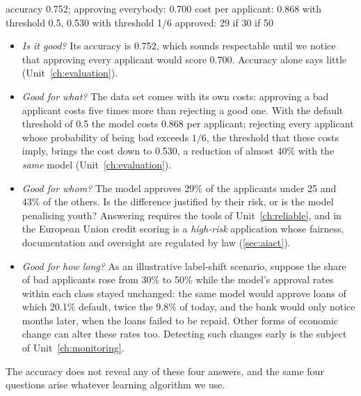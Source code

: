 \begin{pyoutput}
accuracy 0.752; approving everybody: 0.700
cost per applicant: 0.868 with threshold 0.5, 0.530 with threshold 1/6
approved: 29%
if 30%
if 50%
\end{pyoutput}

\begin{itemize}
  \item \emph{Is it good?} Its accuracy is 0.752, which sounds respectable until we notice that approving every
        applicant would score 0.700. Accuracy alone says little (Unit~\ref{ch:evaluation}).
  \item \emph{Good for what?} The data set comes with its own costs: approving a bad applicant costs five times
        more than rejecting a good one. With the default threshold of 0.5 the model costs 0.868 per applicant;
        rejecting every applicant whose probability of being bad exceeds $1/6$, the threshold that these costs
        imply, brings the cost down to 0.530, a reduction of almost 40\% with the \emph{same} model
        (Unit~\ref{ch:evaluation}).
  \item \emph{Good for whom?} The model approves 29\% of the applicants under 25 and 43\% of the others. Is the
        difference justified by their risk, or is the model penalising youth? Answering requires the tools of
        Unit~\ref{ch:reliable}, and in the European Union credit scoring is a \emph{high-risk} application whose
        fairness, documentation and oversight are regulated by law (\cref{sec:aiact}).
  \item \emph{Good for how long?} As an illustrative label-shift scenario, suppose the share of bad applicants rose
        from 30\% to 50\% while the model's approval rates within each class stayed unchanged: the same model would
        approve loans of which 20.1\% default, twice the 9.8\% of today, and the bank would only notice months later,
        when the loans failed to be repaid. Other forms of economic change can alter these rates too. Detecting such changes early is the subject of
        Unit~\ref{ch:monitoring}.
\end{itemize}
The accuracy does not reveal any of these four answers, and the same four questions arise whatever learning algorithm we use.

